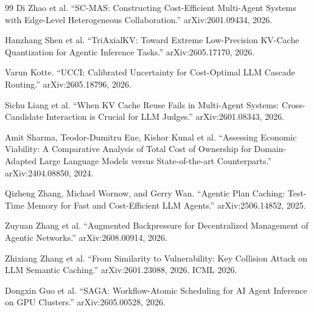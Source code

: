 \begin{thebibliography}{99}
Di Zhao et al.
``SC-MAS: Constructing Cost-Efficient Multi-Agent Systems with Edge-Level Heterogeneous Collaboration.''
arXiv:2601.09434, 2026.

Hanzhang Shen et al.
``TriAxialKV: Toward Extreme Low-Precision KV-Cache Quantization for Agentic Inference Tasks.''
arXiv:2605.17170, 2026.

Varun Kotte.
``UCCI: Calibrated Uncertainty for Cost-Optimal LLM Cascade Routing.''
arXiv:2605.18796, 2026.

Sichu Liang et al.
``When KV Cache Reuse Fails in Multi-Agent Systems: Cross-Candidate Interaction is Crucial for LLM Judges.''
arXiv:2601.08343, 2026.

Amit Sharma, Teodor-Dumitru Ene, Kishor Kunal et al.
``Assessing Economic Viability: A Comparative Analysis of Total Cost of Ownership
for Domain-Adapted Large Language Models versus State-of-the-art Counterparts.''
arXiv:2404.08850, 2024.

Qizheng Zhang, Michael Wornow, and Gerry Wan.
``Agentic Plan Caching: Test-Time Memory for Fast and Cost-Efficient LLM Agents.''
arXiv:2506.14852, 2025.

Zuyuan Zhang et al.
``Augmented Backpressure for Decentralized Management of Agentic Networks.''
arXiv:2608.00914, 2026.

Zhixiang Zhang et al.
``From Similarity to Vulnerability: Key Collision Attack on LLM Semantic Caching.''
arXiv:2601.23088, 2026. ICML 2026.

Dongxin Guo et al.
``SAGA: Workflow-Atomic Scheduling for AI Agent Inference on GPU Clusters.''
arXiv:2605.00528, 2026.
\end{thebibliography}

